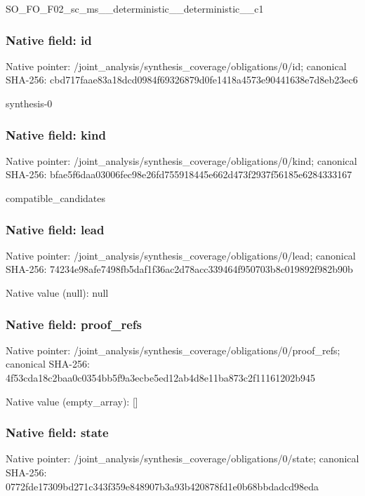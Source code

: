 \documentclass[10pt,a4paper]{article}
\begin{document}
\begingroup\raggedright\sloppy SO\_\allowbreak{}FO\_\allowbreak{}F02\_\allowbreak{}sc\_\allowbreak{}ms\_\allowbreak{}\_\allowbreak{}deterministic\_\allowbreak{}\_\allowbreak{}deterministic\_\allowbreak{}\_\allowbreak{}c1\par\endgroup

\subsubsection{Native field: id}
Native pointer: /joint\_\allowbreak{}analysis/synthesis\_\allowbreak{}coverage/obligations/0/id; canonical SHA-256: cbd717faae83a18dcd0984f69326879d0fe1418a4573e90441638e7d8eb23ec6

\begingroup\raggedright\sloppy synthesis-0\par\endgroup

\subsubsection{Native field: kind}
Native pointer: /joint\_\allowbreak{}analysis/synthesis\_\allowbreak{}coverage/obligations/0/kind; canonical SHA-256: bfae5f6daa03006fec98e26fd755918445e662d473f2937f56185e6284333167

\begingroup\raggedright\sloppy compatible\_\allowbreak{}candidates\par\endgroup

\subsubsection{Native field: lead}
Native pointer: /joint\_\allowbreak{}analysis/synthesis\_\allowbreak{}coverage/obligations/0/lead; canonical SHA-256: 74234e98afe7498fb5daf1f36ac2d78acc339464f950703b8c019892f982b90b

Native value (null): null

\subsubsection{Native field: proof\_\allowbreak{}refs}
Native pointer: /joint\_\allowbreak{}analysis/synthesis\_\allowbreak{}coverage/obligations/0/proof\_\allowbreak{}refs; canonical SHA-256: 4f53cda18c2baa0c0354bb5f9a3ecbe5ed12ab4d8e11ba873c2f11161202b945

Native value (empty\_\allowbreak{}array): []

\subsubsection{Native field: state}
Native pointer: /joint\_\allowbreak{}analysis/synthesis\_\allowbreak{}coverage/obligations/0/state; canonical SHA-256: 0772fde17309bd271c343f359e848907b3a93b420878fd1e0b68bbdadcd98eda
\end{document}
